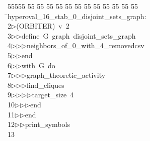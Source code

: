 %
%
\begin{tabbing}
55555 \= 55 \= 55 \= 55 \= 55 \= 55 \= 55 \= 55 \= 55 \= 55 \= 55 \= 55 \= 55 \= \>hyperoval\_16\_stab\_0\_disjoint\_sets\_graph:\\[0pt]
2\>$\triangleright$\>(ORBITER)\ v\ 2\ \\[0pt]
3\>$\triangleright$\>$\triangleright$\>define\ G\ graph\ disjoint\_sets\_graph\ \\[0pt]
4\>$\triangleright$\>$\triangleright$\>$\triangleright$\>neighbors\_of\_0\_with\_4\_removedcsv\ \\[0pt]
5\>$\triangleright$\>$\triangleright$\>end\ \\[0pt]
6\>$\triangleright$\>$\triangleright$\>with\ G\ do\ \\[0pt]
7\>$\triangleright$\>$\triangleright$\>$\triangleright$\>graph\_theoretic\_activity\ \\[0pt]
8\>$\triangleright$\>$\triangleright$\>$\triangleright$\>find\_cliques\ \\[0pt]
9\>$\triangleright$\>$\triangleright$\>$\triangleright$\>$\triangleright$\>target\_size\ 4\ \\[0pt]
10\>$\triangleright$\>$\triangleright$\>$\triangleright$\>end\ \\[0pt]
11\>$\triangleright$\>$\triangleright$\>end\ \\[0pt]
12\>$\triangleright$\>$\triangleright$\>print\_symbols\\[0pt]
13\>\end{tabbing}
